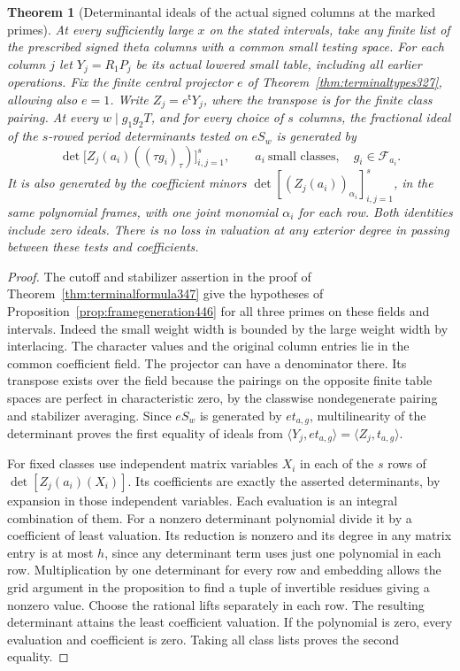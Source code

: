 \documentclass[a4paper,11pt]{article}
\newtheorem{theorem}[proposition]{Theorem}
\theoremstyle{definition}
\theoremstyle{remark}
\numberwithin{equation}{section}
\begin{document}
\begin{theorem}[Determinantal ideals of the actual signed columns at the marked primes]\leavevmode
\label{thm:frameperiods446}
At every sufficiently large \(x\) on the stated intervals, take any
finite list of the prescribed signed theta columns with a common
small testing space. For each column \(j\) let \(Y_j=R_1P_j\) be
its actual lowered small table, including all earlier operations.
Fix the finite central projector \(e\) of
Theorem~\ref{thm:terminaltypes327}, allowing also \(e=1\).
Write \(Z_j=e^{\mathsf t}Y_j\), where the transpose is for the
finite class pairing. At every \(w\mid g_1g_2T\), and for every
choice of \(s\) columns, the fractional ideal of the \(s\)-rowed
period determinants tested on \(eS_w\) is generated by
\[
   \det\big[Z_j(a_i)((\tau g_i)_\tau)\big]_{i,j=1}^{s},
        \qquad a_i\ \text{small classes},\quad g_i\in\mathcal F_{a_i}.
\]
It is also generated by the coefficient minors
\(\det[(Z_j(a_i))_{\alpha_i}]_{i,j=1}^{s}\), in the same polynomial
frames, with one joint monomial \(\alpha_i\) for each row. Both
identities include zero ideals. There is no loss in valuation at
any exterior degree in passing between these tests and coefficients.
\end{theorem}
\begin{proof}
The cutoff and stabilizer assertion in the proof of
Theorem~\ref{thm:terminalformula347} give the hypotheses of
Proposition~\ref{prop:framegeneration446} for all three primes
on these fields and intervals. Indeed the small weight width is
bounded by the large weight width by interlacing. The character
values and the original column entries lie in the common
coefficient field. The projector can have a denominator there.
Its transpose exists over the field because the pairings on the
opposite finite table spaces are perfect in characteristic zero,
by the classwise nondegenerate pairing and stabilizer averaging.
Since \(eS_w\) is generated by \(e t_{a,g}\), multilinearity of
the determinant proves the first equality of ideals from
\(\langle Y_j,e t_{a,g}\rangle=\langle Z_j,t_{a,g}\rangle\).

For fixed classes use independent matrix variables \(X_i\) in
each of the \(s\) rows of \(\det[Z_j(a_i)(X_i)]\). Its coefficients
are exactly the asserted determinants, by expansion in those
independent variables. Each evaluation is an integral combination
of them. For a nonzero determinant polynomial divide it by a
coefficient of least valuation. Its reduction is nonzero and its
degree in any matrix entry is at most \(h\), since any determinant
term uses just one polynomial in each row. Multiplication by one
determinant for every row and embedding allows the grid argument
in the proposition to find a tuple of invertible residues giving a
nonzero value. Choose the rational lifts separately in each row.
The resulting determinant attains the least coefficient valuation.
If the polynomial is zero, every evaluation and coefficient is zero.
Taking all class lists proves the second equality.
\end{proof}
\end{document}
